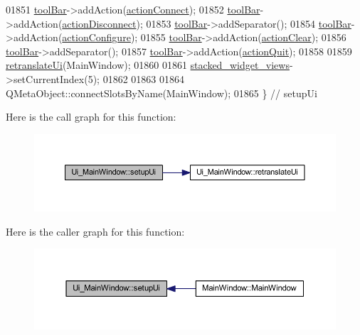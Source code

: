 \begin{DoxyCode}
01851         \hyperlink{a00027_ab84dc49349f514d7b7d3fe8e78de069b}{toolBar}->addAction(\hyperlink{a00027_aa0785566311fc48271690fb68b1d4c5f}{actionConnect});
01852         \hyperlink{a00027_ab84dc49349f514d7b7d3fe8e78de069b}{toolBar}->addAction(\hyperlink{a00027_a8a16b3aef75b279eaaa887152d2f746b}{actionDisconnect});
01853         \hyperlink{a00027_ab84dc49349f514d7b7d3fe8e78de069b}{toolBar}->addSeparator();
01854         \hyperlink{a00027_ab84dc49349f514d7b7d3fe8e78de069b}{toolBar}->addAction(\hyperlink{a00027_a3860abde3cfd3f6170e28fddde73f11e}{actionConfigure});
01855         \hyperlink{a00027_ab84dc49349f514d7b7d3fe8e78de069b}{toolBar}->addAction(\hyperlink{a00027_ac8539dcd87955047877cb256aff60453}{actionClear});
01856         \hyperlink{a00027_ab84dc49349f514d7b7d3fe8e78de069b}{toolBar}->addSeparator();
01857         \hyperlink{a00027_ab84dc49349f514d7b7d3fe8e78de069b}{toolBar}->addAction(\hyperlink{a00027_a188c243f36a2dbc10e4e2a0ad94273b1}{actionQuit});
01858 
01859         \hyperlink{a00027_a097dd160c3534a204904cb374412c618}{retranslateUi}(MainWindow);
01860 
01861         \hyperlink{a00027_a59e39bd3d716004e840a5be5dda18b96}{stacked\_widget\_views}->setCurrentIndex(5);
01862 
01863 
01864         QMetaObject::connectSlotsByName(MainWindow);
01865     \} \textcolor{comment}{// setupUi}
\end{DoxyCode}


Here is the call graph for this function\+:
\nopagebreak
\begin{figure}[H]
\begin{center}
\leavevmode
\includegraphics[width=350pt]{d0/d33/a00027_acf4a0872c4c77d8f43a2ec66ed849b58_cgraph}
\end{center}
\end{figure}




Here is the caller graph for this function\+:
\nopagebreak
\begin{figure}[H]
\begin{center}
\leavevmode
\includegraphics[width=350pt]{d0/d33/a00027_acf4a0872c4c77d8f43a2ec66ed849b58_icgraph}
\end{center}
\end{figure}




